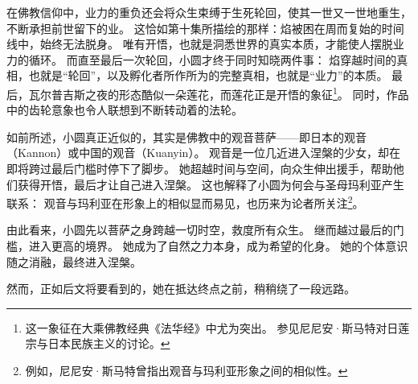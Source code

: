 在佛教信仰中，业力的重负还会将众生束缚于生死轮回，使其一世又一世地重生，不断承担前世留下的业\cite{smart1998ingredients-indian-religion}。
这恰如第十集所描绘的那样：焰被困在周而复始的时间线中，始终无法脱身。
唯有开悟，也就是洞悉世界的真实本质，才能使人摆脱业力的循环。
而直至最后一次轮回，小圆才终于同时知晓两件事：
焰穿越时间的真相，也就是“轮回”，以及孵化者所作所为的完整真相，也就是“业力”的本质。
最后，瓦尔普吉斯之夜的形态酷似一朵莲花，而莲花正是开悟的象征\footnote{%
    这一象征在大乘佛教经典《法华经》中尤为突出。
    参见尼尼安·斯马特对日莲宗与日本民族主义的讨论\cite{smart1998nichiren-japanese-nationalism}。
}。
同时，作品中的齿轮意象也令人联想到不断转动着的法轮\cite{smart1998buddhism}。

如前所述，小圆真正近似的，其实是佛教中的观音菩萨——即日本的观音（Kannon）或中国的观音（Kuanyin）。
观音是一位几近进入涅槃的少女，却在即将跨过最后门槛时停下了脚步。
她超越时间与空间，向众生伸出援手，帮助他们获得开悟，最后才让自己进入涅槃。
这也解释了小圆为何会与圣母玛利亚产生联系：
观音与玛利亚在形象上的相似显而易见，也历来为论者所关注\footnote{%
    例如，尼尼安·斯马特曾指出观音与玛利亚形象之间的相似性。
}\cite{smart1993buddhism-christianity}。

由此看来，小圆先以菩萨之身跨越一切时空，救度所有众生。
继而越过最后的门槛，进入更高的境界。
她成为了自然之力本身，成为希望的化身。
她的个体意识随之消融，最终进入涅槃。

然而，正如后文将要看到的，她在抵达终点之前，稍稍绕了一段远路。
